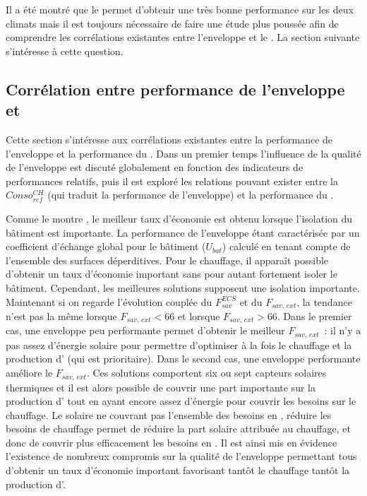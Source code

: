Il a été montré que le  permet d’obtenir une très bonne performance sur les deux
climats mais il est toujours nécessaire de faire une étude plus poussée afin de comprendre
les corrélations existantes entre l’enveloppe et le . La section suivante
s’intéresse à cette question.



\subsection{Corrélation entre performance de l’enveloppe et } %
\label{sub:correlation_entre_performance_de_l_enveloppe_et_ssc}
Cette section s’intéresse aux corrélations existantes entre la performance de l’enveloppe
et la performance du . Dans un premier temps l’influence de la qualité de
l’enveloppe est discuté globalement en fonction des indicateurs de performances relatifs,
puis il est exploré les relations pouvant exister entre la $Conso_{ref}^{CH}$ (qui traduit
la performance de l’enveloppe) et la performance du .

Comme le montre , le meilleur taux d’économie est
obtenu lorsque l’isolation du bâtiment est importante. La performance de l’enveloppe
étant caractérisée par un coefficient d’échange global pour le bâtiment ($U_{bat}$) calculé
en tenant compte de l’ensemble des surfaces déperditives. Pour le chauffage, il apparaît
possible d’obtenir un taux d’économie important sans pour autant fortement isoler le
bâtiment. Cependant, les meilleures solutions supposent une isolation importante.
Maintenant si on regarde l’évolution couplée du $F_{sav}^{ECS}$ et du $F_{sav,\, ext}$, la
tendance n’est pas la même lorsque $F_{sav,\, ext} < 66$ et lorsque $F_{sav,\, ext} > 66$.
Dans le premier cas, une enveloppe peu performante permet d’obtenir le meilleur $F_{sav,\,ext}$~:
il n’y a pas assez d’énergie solaire pour permettre d’optimiser à la fois le
chauffage et la production d’ (qui est prioritaire). Dans le second cas, une
enveloppe performante améliore le $F_{sav,\, ext}$. Ces solutions comportent six ou sept
capteurs solaires thermiques et il est alors possible de couvrir une part importante sur
la production d’ tout en ayant encore assez d’énergie pour couvrir les besoins sur
le chauffage. Le solaire ne couvrant pas l’ensemble des besoins en
, réduire les besoins de chauffage permet de réduire la part solaire attribuée au
chauffage, et donc de couvrir plus efficacement les besoins en .
Il est ainsi mis en évidence l’existence de nombreux compromis sur la qualité de l’enveloppe
permettant tous d’obtenir un taux d’économie important favorisant tantôt le chauffage
tantôt la production d’.

